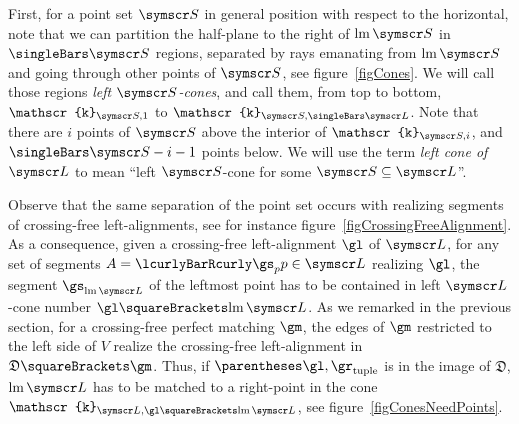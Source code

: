 \documentclass[10pt, a4paper, twoside]{basestyle}
\DeclareMathOperator{\leftmost}{lm}
\newcommand{\pointset}{\symscr}
\newcommand{\lcone}[1]{\mathscr{k}_{\pointset L, #1}}
\newcommand{\scone}[1]{\mathscr{k}_{\pointset S, #1}}
\newcommand{\decomposition}{\mathfrak{D}}
\begin{document}
First, for a point set $\pointset S$ in general position with respect to the horizontal,
note that we can partition the half-plane to the right of $\leftmost\pointset S$ in
$\Cardinality{\pointset S}$ regions,
separated by rays emanating from $\leftmost\pointset S$ and going through other points of
$\pointset S$, see figure~\ref{figCones}.
We will call those regions \emph{left $\pointset S$-cones}, and call them, from top to bottom, $\scone 1$ to
$\scone {\Cardinality{\pointset L}}$.
Note that there are $i$ points of $\pointset S$ above the interior of $\scone i$,
and $\Cardinality {\pointset S} - i - 1$ points below.
We will use the term \emph{left cone of $\pointset L$} to mean
``left $\pointset S$-cone for some $\pointset S\Subset\pointset L$''.

Observe that the same separation of the point set occurs with realizing segments of crossing-free left-alignments,
see for instance figure~\ref{figCrossingFreeAlignment}.
As a consequence, given a crossing-free left-alignment
$\gl$ of $\pointset L$, for any set of segments $A=\setst{\gs_p}{p\in\pointset L}$
realizing $\gl$, the segment $\gs_{\leftmost\pointset L}$ of the leftmost point has to be contained in left
$\pointset L$-cone number $\gl\of{\leftmost\pointset L}$.
As we remarked in the previous section, for a crossing-free perfect matching $\gm$, the edges of $\gm$ restricted
to the left side of $V$ realize the crossing-free
left-alignment in $\decomposition\of\gm$. Thus, if $\tuple{\gl, \gr}$ is in the image of
$\decomposition$, $\leftmost\pointset L$ has to be matched to a right-point in the cone
$\lcone{\gl\of{\leftmost\pointset L}}$, see figure~\ref{figConesNeedPoints}.
\end{document}

